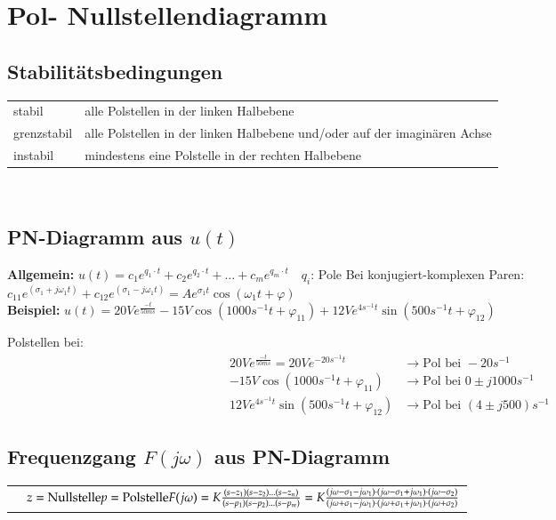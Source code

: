 \section{Pol- Nullstellendiagramm}
\subsection{Stabilitätsbedingungen}
\begin{tabular}{ll}
	stabil & alle Polstellen in der linken Halbebene\\
	grenzstabil & alle Polstellen in der linken Halbebene und/oder auf der
	imaginären Achse\\
	instabil & mindestens eine Polstelle in der rechten Halbebene
\end{tabular}\\

\subsection{PN-Diagramm aus $u(t)$}

\newline
\textbf{Allgemein:} \newline
$u(t)=c_1 e^{q_1 \cdot t}+c_2 e^{q_2\cdot t}+\ldots+c_m e^{q_m \cdot t}\quad
q_i$: Pole\newline 
Bei konjugiert-komplexen Paren: $c_{11}e^{(\sigma_1+j\omega_1
t)}+c_{12}e^{(\sigma_1-j\omega_1 t)}=Ae^{\sigma_1 t}\cos{(\omega_1
t+\varphi)}$\\
\textbf{Beispiel:} \newline
$u(t)=20Ve^{\frac{-t}{50ms}}-15V\cos(1000s^{-1}t+\varphi_{11})+12Ve^{4s^{-1}t}\sin(500s^{-1}t+\varphi_{12})$

Polstellen bei: \\
\begin{align}
	20Ve^{\frac{-t}{50ms}} = 20Ve^{-20s^{-1}t} &\rightarrow \text{Pol bei }
	-20s^{-1}\nonumber\\
	-15V\cos(1000s^{-1}t+\varphi_{11}) &\rightarrow \text{Pol bei }
	0\pm j1000s^{-1}\nonumber\\
	12Ve^{4s^{-1}t}\sin(500s^{-1}t+\varphi_{12}) &\rightarrow \text{Pol bei } (4\pm
	j500)s^{-1}\nonumber
\end{align}


\subsection{Frequenzgang $F(j\omega)$ aus PN-Diagramm}
\begin{tabular}{cp{12cm}}
\parbox[c][5cm]{5.3cm}{}
& $z =\text{Nullstelle}\newline
p=\text{Polstelle}\newline
F(j\omega)=K\frac{(s-z_1)(s-z_2)\ldots(s-z_n)}{(s-p_1)(s-p_2)\ldots
(s-p_m)}=K\frac{(j\omega-\sigma_1-j\omega_1)\cdot(j\omega-\sigma_1+j\omega_1)\cdot(j\omega-\sigma_2)}{(j\omega+\sigma_1-j\omega_1)\cdot(j\omega+\sigma_1+j\omega_1)\cdot(j\omega+\sigma_2)}$
\end{tabular}

